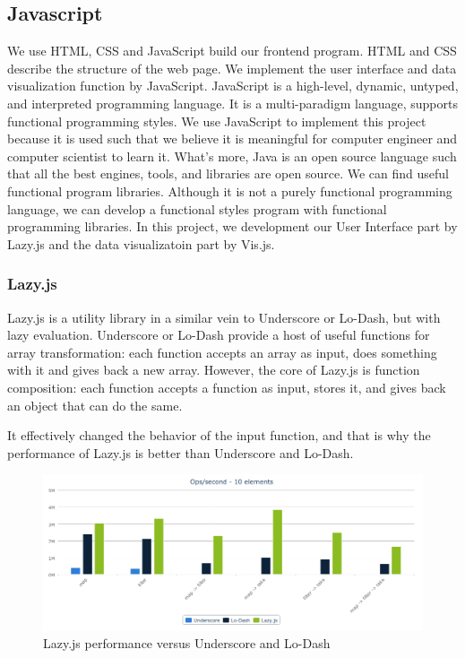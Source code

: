 \subsection{Javascript}

We use HTML, CSS and JavaScript build our frontend program. HTML and CSS describe the structure of the web page. We implement the user interface and data visualization function by JavaScript. JavaScript is a high-level, dynamic, untyped, and interpreted programming language.\cite{JS11} It is a multi-paradigm language, supports functional programming styles. We use JavaScript to implement this project because it is used such that we believe it is meaningful for computer engineer and computer scientist to learn it. What's more,  Java is an open source language such that all the best engines, tools, and libraries are open source. We can find useful functional program libraries. Although it is not a purely functional programming language, we can develop a functional styles program with functional programming libraries. In this project, we development our User Interface part by Lazy.js and the data visualizatoin part by Vis.js.

\subsubsection{Lazy.js}
Lazy.js is a utility library in a similar vein to Underscore or Lo-Dash, but with lazy evaluation.  Underscore or Lo-Dash provide a host of useful functions for array transformation: each function accepts an array as input,  does something with it and gives back a new array. However, the core of Lazy.js is function composition: each function accepts a function as input, stores it, and gives back an object that can do the same. 

It effectively changed the behavior of the input function, and that is why the performance of Lazy.js is better than Underscore and Lo-Dash. 
\begin{figure}[h]
\centering
		\includegraphics[width=\linewidth]{figure/lazy-performance}
	\caption{Lazy.js performance versus Underscore and Lo-Dash}
	\label{fig:lazy-performance}
\end{figure}

